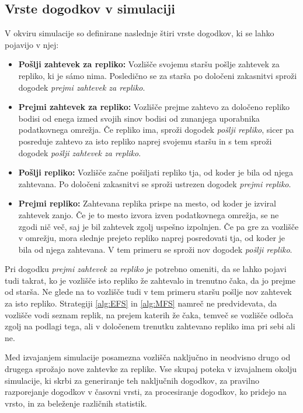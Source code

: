 \documentclass[a4paper, 12pt]{book}
\begin{document}
\subsection{Vrste dogodkov v simulaciji}
V okviru simulacije so definirane naslednje štiri vrste dogodkov, ki se lahko
pojavijo v njej:
\begin{itemize}
  \item \textbf{Pošlji zahtevek za repliko:} Vozlišče svojemu staršu pošlje
  zahtevek za repliko, ki je sámo nima. Posledično se za starša po določeni
  zakasnitvi sproži dogodek \textit{prejmi zahtevek za repliko}.

  \item \textbf{Prejmi zahtevek za repliko:} Vozlišče prejme zahtevo za
  določeno repliko bodisi od enega izmed svojih sinov bodisi od zunanjega
  uporabnika podatkovnega omrežja. Če repliko ima, sproži dogodek
  \textit{pošlji repliko}, sicer pa posreduje zahtevo za isto repliko
  naprej svojemu staršu in s tem sproži dogodek \textit{pošlji zahtevek za
  repliko}.

  \item \textbf{Pošlji repliko:} Vozlišče začne pošiljati repliko tja, od
  koder je bila od njega zahtevana. Po določeni zakasnitvi se sproži ustrezen
  dogodek \textit{prejmi repliko}.

  \item \textbf{Prejmi repliko:} Zahtevana replika prispe na mesto, od
  koder je izviral zahtevek zanjo. Če je to mesto izvora izven podatkovnega
  omrežja, se ne zgodi nič več, saj je bil zahtevek zgolj uspešno izpolnjen.
  Če pa gre za vozlišče v omrežju, mora slednje prejeto repliko naprej
  posredovati tja, od koder je bila od njega zahtevana. V tem primeru se
  sproži nov dogodek \textit{pošlji repliko}.
\end{itemize}

Pri dogodku \textit{prejmi zahtevek za repliko} je potrebno omeniti, da se
lahko pojavi tudi takrat, ko je vozlišče isto repliko že zahtevalo in trenutno
čaka, da jo prejme od starša. Ne glede na to vozlišče tudi v tem primeru staršu
pošlje nov zahtevek za isto repliko. Strategiji \ref{alg:EFS} in \ref{alg:MFS}
namreč ne predvidevata, da vozlišče vodi seznam replik, na prejem katerih
že čaka, temveč se vozlišče odloča zgolj na podlagi tega, ali v določenem
trenutku zahtevano repliko ima pri sebi ali ne.

Med izvajanjem simulacije posamezna vozlišča naključno in neodvisno drugo od
drugega sprožajo nove zahtevke za replike. Vse skupaj poteka v izvajalnem
okolju simulacije, ki skrbi za generiranje teh naključnih dogodkov, za
pravilno razporejanje dogodkov v časovni vrsti, za procesiranje dogodkov,
ko pridejo na vrsto, in za beleženje različnih statistik.
\end{document}
